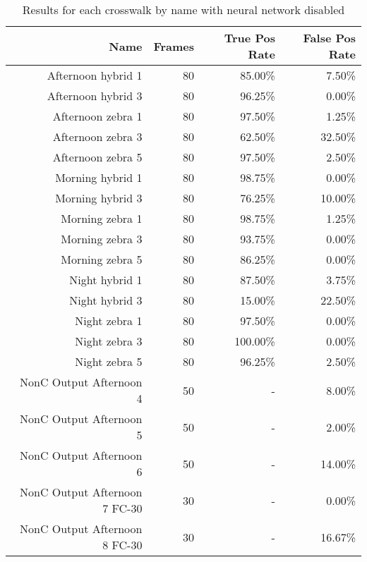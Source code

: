    \begin{longtable}{|r|r|r|r|}
    \caption{Results for each crosswalk by name with neural network disabled}
    \label{tab:appendixcrosswalkresultswithoutNeural} \\
        \hline
    Name  & Frames & True Pos Rate & False Pos Rate \bigstrut\\
    \hline
    Afternoon hybrid 1 & 80    & 85.00\% & 7.50\% \bigstrut\\
    \hline
    Afternoon hybrid 3 & 80    & 96.25\% & 0.00\% \bigstrut\\
    \hline
    Afternoon zebra 1 & 80    & 97.50\% & 1.25\% \bigstrut\\
    \hline
    Afternoon zebra 3 & 80    & 62.50\% & 32.50\% \bigstrut\\
    \hline
    Afternoon zebra 5 & 80    & 97.50\% & 2.50\% \bigstrut\\
    \hline
    Morning hybrid 1 & 80    & 98.75\% & 0.00\% \bigstrut\\
    \hline
    Morning hybrid 3 & 80    & 76.25\% & 10.00\% \bigstrut\\
    \hline
    Morning zebra 1 & 80    & 98.75\% & 1.25\% \bigstrut\\
    \hline
    Morning zebra 3 & 80    & 93.75\% & 0.00\% \bigstrut\\
    \hline
    Morning zebra 5 & 80    & 86.25\% & 0.00\% \bigstrut\\
    \hline
    Night hybrid 1 & 80    & 87.50\% & 3.75\% \bigstrut\\
    \hline
    Night hybrid 3 & 80    & 15.00\% & 22.50\% \bigstrut\\
    \hline
    Night zebra 1 & 80    & 97.50\% & 0.00\% \bigstrut\\
    \hline
    Night zebra 3 & 80    & 100.00\% & 0.00\% \bigstrut\\
    \hline
    Night zebra 5 & 80    & 96.25\% & 2.50\% \bigstrut\\
    \hline
    NonC Output Afternoon 4 & 50    & -     & 8.00\% \bigstrut\\
    \hline
    NonC Output Afternoon 5 & 50    & -     & 2.00\% \bigstrut\\
    \hline
    NonC Output Afternoon 6 & 50    & -     & 14.00\% \bigstrut\\
    \hline
    NonC Output Afternoon 7 FC-30 & 30    & -     & 0.00\% \bigstrut\\
    \hline
    NonC Output Afternoon 8 FC-30 & 30    & -     & 16.67\% \bigstrut\\

\end{longtable}
